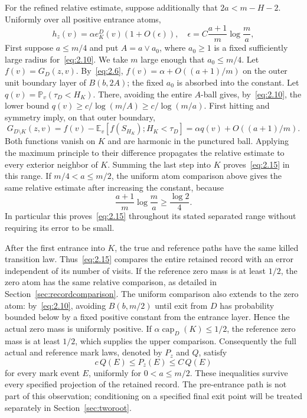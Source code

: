 \documentclass[11pt,letterpaper,reqno]{amsart}
\numberwithin{equation}{section}
\theoremstyle{remark}
\begin{document}
For the refined relative estimate, suppose additionally that $2a<m-H-2$. Uniformly over all positive entrance atoms,
\begin{equation}\label{eq:2.15}
h_z(v)=\alpha e_K^D(v)(1+O(\epsilon)),\quad
\epsilon=C\frac{a+1}{m}\log\frac ma,
\end{equation}
First suppose $a\le m/4$ and put $A=a\vee a_0$, where $a_0\ge1$ is a fixed sufficiently large radius for~\eqref{eq:2.10}. We take $m$ large enough that $a_0\le m/4$. Let $f(v)=G_D(z,v)$. By~\eqref{eq:2.6}, $f(v)=\alpha+O((a+1)/m)$ on the outer unit boundary layer of $B(b,2A)$; the fixed $a_0$ is absorbed into the constant. Let $q(v)=\mathbb P_v(\tau_D<H_K)$. There, avoiding the entire $A$-ball gives, by~\eqref{eq:2.10}, the lower bound $q(v)\ge c/\log(m/A)\ge c/\log(m/a)$. First hitting and symmetry imply, on that outer boundary,
\[
G_{D\setminus K}(z,v)
=f(v)-\mathbb E_v[f(S_{H_K});H_K<\tau_D]
=\alpha q(v)+O((a+1)/m).
\]
Both functions vanish on $K$ and are harmonic in the punctured ball. Applying the maximum principle to their difference propagates the relative estimate to every exterior neighbor of $K$. Summing the last step into $K$ proves~\eqref{eq:2.15} in this range. If $m/4<a\le m/2$, the uniform atom comparison above gives the same relative estimate after increasing the constant, because
\[
\frac{a+1}{m}\log\frac ma\ge\frac{\log2}{4}.
\]
In particular this proves~\eqref{eq:2.15} throughout its stated separated range without requiring its error to be small.

After the first entrance into $K$, the true and reference paths have the same killed transition law. Thus~\eqref{eq:2.15} compares the entire retained record with an error independent of its number of visits. If the reference zero mass is at least $1/2$, the zero atom has the same relative comparison, as detailed in Section~\ref{sec:recordcomparison}. The uniform comparison also extends to the zero atom: by~\eqref{eq:2.10}, avoiding $B(b,m/2)$ until exit from $D$ has probability bounded below by a fixed positive constant from the entrance layer. Hence the actual zero mass is uniformly positive. If $\alpha\operatorname{cap}_D(K)\le1/2$, the reference zero mass is at least $1/2$, which supplies the upper comparison. Consequently the full actual and reference mark laws, denoted by $P_z$ and $Q$, satisfy
\[
c\,Q(E)\le P_z(E)\le C\,Q(E)
\]
for every mark event $E$, uniformly for $0<a\le m/2$. These inequalities survive every specified projection of the retained record. The pre-entrance path is not part of this observation; conditioning on a specified final exit point will be treated separately in Section~\ref{sec:tworoot}.
\end{document}
